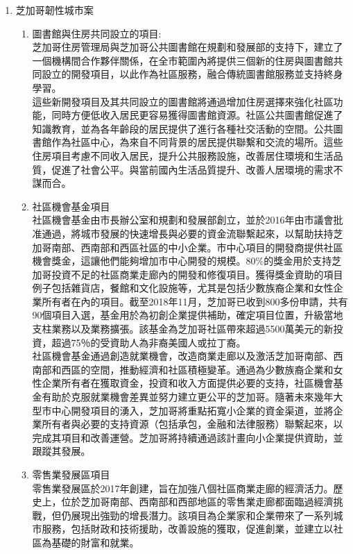 \documentclass[a4paper,12pt]{article}
\begin{document}
\begin{enumerate}
\item 芝加哥韌性城市案
\label{sec:org847d31f}
\begin{enumerate}
\item 圖書館與住房共同設立的項目:\\
芝加哥住房管理局與芝加哥公共圖書館在規劃和發展部的支持下，建立了一個機構間合作夥伴關係，在全市範圍內將提供三個新的住房與圖書館共同設立的開發項目，以此作為社區服務，融合傳統圖書館服務並支持終身學習。\\

這些新開發項目及其共同設立的圖書館將通過增加住房選擇來強化社區功能，同時方便低收入居民更容易獲得圖書館資源。社區公共圖書館促進了知識教育，並為各年齡段的居民提供了進行各種社交活動的空間。公共圖書館作為社區中心，為來自不同背景的居民提供聯繫和交流的場所。這些住房項目考慮不同收入居民，提升公共服務設施，改善居住環境和生活品質，促進了社會公平。與當前國內生活品質提升、改善人居環境的需求不謀而合。\\

\item 社區機會基金項目\\
社區機會基金由市長辦公室和規劃和發展部創立，並於2016年由市議會批准通過，將城市發展的快速增長與必要的資金流聯繫起來，以幫助扶持芝加哥南部、西南部和西區社區的中小企業。市中心項目的開發商提供社區機會獎金，這讓他們能夠增加市中心開發的規模。80\%的獎金用於支持芝加哥投資不足的社區商業走廊內的開發和修復項目。獲得獎金資助的項目例子包括雜貨店，餐館和文化設施等，尤其是包括少數族裔企業和女性企業所有者在內的項目。截至2018年11月，芝加哥已收到800多份申請，共有90個項目入選，基金用於為初創企業提供補助，確定項目位置，升級當地支柱業務以及業務擴張。該基金為芝加哥社區帶來超過5500萬美元的新投資，超過75％的受資助人為非裔美國人或拉丁裔。\\

社區機會基金通過創造就業機會，改造商業走廊以及激活芝加哥南部、西南部和西區的空間，推動經濟和社區積極變革。通過為少數族裔企業和女性企業所有者在獲取資金，投資和收入方面提供必要的支持，社區機會基金有助於克服就業機會差異並努力建立更公平的芝加哥。隨著未來幾年大型市中心開發項目的湧入，芝加哥將重點拓寬小企業的資金渠道，並將企業所有者與必要的支持資源（包括承包，金融和法律服務）聯繫起來，以完成其項目和改善運營。芝加哥將持續通過該計畫向小企業提供資助，並跟蹤其發展。\\

\item 零售業發展區項目\\
零售業發展區於2017年創建，旨在加強八個社區商業走廊的經濟活力。歷史上，位於芝加哥南部、西南部和西部地區的零售業走廊都面臨過經濟挑戰，但仍展現出強勁的增長潛力。該項目為企業家和企業帶來了一系列城市服務，包括財政和技術援助，改善設施的獲取，促進創業，並建立以社區為基礎的財富和就業。\\


\end{enumerate}
\end{enumerate}
\end{document}
